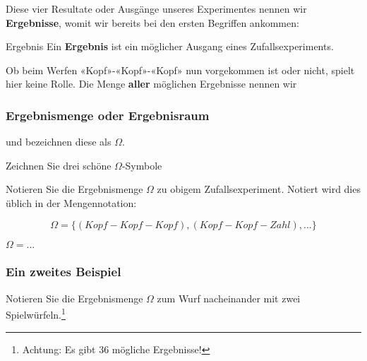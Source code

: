 
Diese vier Resultate oder Ausgänge unseres Experimentes nennen wir \textbf{Ergebnisse}, womit wir bereits
bei den ersten Begriffen ankommen:

\begin{definition}{Ergebnis}{}
Ein \textbf{Ergebnis} ist ein möglicher Ausgang eines
Zufallsexperiments.
\end{definition}

Ob beim Werfen «Kopf»-«Kopf»-«Kopf» nun
vorgekommen ist oder nicht, spielt hier keine Rolle. Die Menge \textbf{aller}
möglichen Ergebnisse nennen wir

\subsubsection{Ergebnismenge oder Ergebnisraum}

und bezeichnen diese als $\Omega$.

Zeichnen Sie drei schöne {\huge $\Omega$}-Symbole


Notieren Sie die Ergebnismenge $\Omega$ zu obigem
Zufallsexperiment. Notiert wird dies üblich in der Mengennotation:

$$\Omega = \{ (Kopf-Kopf-Kopf), (Kopf-Kopf-Zahl), ...\}$$

$\Omega = ...$

\newpage

\subsubsection{Ein zweites Beispiel}
Notieren Sie die Ergebnismenge $\Omega$ zum Wurf nacheinander mit zwei
Spielwürfeln.\footnote{Achtung: Es gibt 36 mögliche Ergebnisse!}

